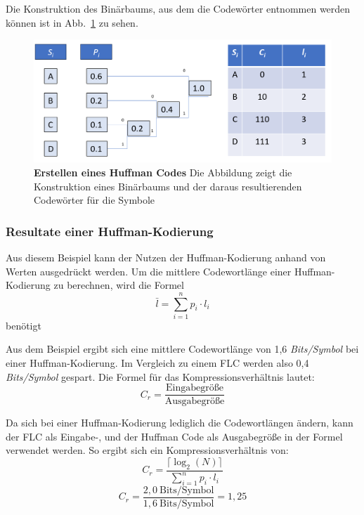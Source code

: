 Die Konstruktion des Binärbaums, aus dem die Codewörter entnommen werden können ist in Abb.~\ref{fig:huffman_example} zu sehen.

\begin{figure}[htb]
  \centering  
  \includegraphics[scale=0.4]{Bilder/Huffmancode_beispiel.png}
  \caption[Huffman Code Beispiel]{\textbf{Erstellen eines Huffman Codes} Die Abbildung zeigt die Konstruktion eines Binärbaums und der daraus resultierenden Codewörter für die Symbole}
  \label{fig:huffman_example}
\end{figure}

\subsubsection{Resultate einer Huffman-Kodierung}
\label{subsec:huffman_res}
Aus diesem Beispiel kann der Nutzen der Huffman-Kodierung anhand von Werten ausgedrückt werden. \newline
Um die mittlere Codewortlänge einer Huffman-Kodierung zu berechnen, wird die Formel
\begin{equation*}
\bar{l} = \sum_{i=1}^{n} p_i \cdot l_i
\end{equation*}
benötigt \newline

Aus dem Beispiel ergibt sich eine mittlere Codewortlänge von 1,6 \textit{Bits/Symbol} bei einer Huffman-Kodierung.
Im Vergleich zu einem FLC werden also 0,4 \textit{Bits/Symbol} gespart. 
Die Formel für das Kompressionsverhältnis lautet:
\begin{equation*}
C_r = \frac{\text{Eingabegröße}}{\text{Ausgabegröße}}
\end{equation*}

Da sich bei einer Huffman-Kodierung lediglich die Codewortlängen ändern, kann der FLC als Eingabe-, und der Huffman Code als Ausgabegröße in der Formel verwendet werden.
So ergibt sich ein Kompressionsverhältnis von:
\begin{equation*}
C_r = \frac{\lceil \log_2(N) \rceil}{\sum_{i=1}^{n} p_i \cdot l_i}
\end{equation*}
\begin{equation*}
C_r = \frac{2,0 \ \text{Bits/Symbol}}{1,6 \ \text{Bits/Symbol}} = 1,25
\end{equation*}

